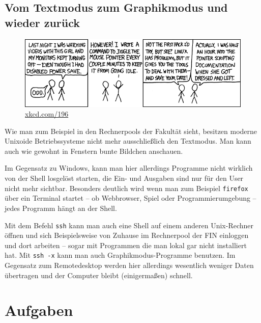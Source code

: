 \subsection{Vom Textmodus zum Graphikmodus und wieder zurück}
\begin{figure}
	\centering
	\includegraphics[width=\textwidth]{images/command_line_fu.png}
	\caption{\href{http://xkcd.com/196}{xkcd.com/196}}
\end{figure}
Wie man zum Beispiel in den Rechnerpools der Fakultät sieht, besitzen moderne Unixoide Betriebssysteme nicht mehr ausschließlich den Textmodus. Man kann auch wie gewohnt in Fenstern bunte Bildchen anschauen.

Im Gegensatz zu Windows, kann man hier allerdings Programme nicht wirklich von der Shell losgelöst starten, die Ein- und Ausgaben sind nur für den User nicht mehr sichtbar. 
Besonders deutlich wird wenn man zum Beispiel \lstinline$firefox$ über ein Terminal startet – ob Webbrowser, Spiel oder Programmierumgebung – jedes Programm hängt an der Shell.

Mit dem Befehl \lstinline$ssh$ kann man auch eine Shell auf einem anderen Unix-Rechner öffnen und sich Beispielsweise von Zuhause im Rechnerpool der FIN einloggen und dort arbeiten – sogar mit Programmen die man lokal gar nicht installiert hat. 
Mit \lstinline$ssh -x$ kann man auch Graphikmodus-Programme benutzen.
Im Gegensatz zum Remotedesktop werden hier allerdings wesentlich weniger Daten übertragen und der Computer bleibt (einigermaßen) schnell.

\section {Aufgaben}

